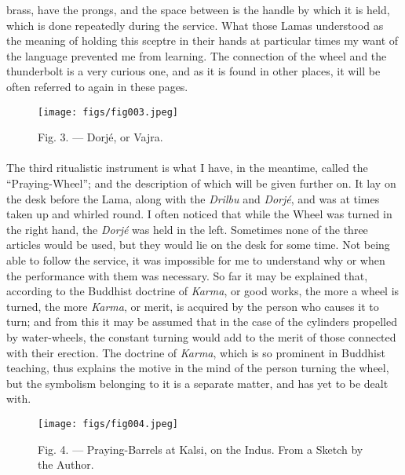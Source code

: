 \documentclass[a4paper, 11pt, oneside, polutonikogreek, english]{article}
\begin{document}
brass, have the prongs, and the space between is the handle by which it is held, which is done repeatedly during the service. What those Lamas understood as the meaning of holding this sceptre in their hands at particular times my want of the language prevented me from learning. The connection of the wheel and the thunderbolt is a very curious one, and as it is found in other places, it will be often referred to again in these pages.

\begin{figure}[H]
\centering
\texttt{[image: figs/fig003.jpeg]}
\caption{Fig. 3. --- Dorjé, or Vajra.}
\end{figure}
\paragraph{}
The third ritualistic instrument is what I have, in the meantime, called the ``Praying-Wheel''; and the description of which will be given further on. It lay on the desk before the Lama, along with the \emph{Drilbu} and \emph{Dorjé}, and was at times taken up and whirled round. I often noticed that while the Wheel was turned in the right hand, the \emph{Dorjé} was held in the left. Sometimes none of the three articles would be used, but they would lie on the desk for some time. Not being able to follow the service, it was impossible for me to understand why or when the performance with them was necessary. So far it may be explained that, according to the Buddhist doctrine of \emph{Karma}, or good works, the more a wheel is turned, the more \emph{Karma}, or merit, is acquired by the person who causes it to turn; and from this it may be assumed that in the case of the cylinders propelled by water-wheels, the constant turning would add to the merit of those connected with their erection. The doctrine of \emph{Karma}, which is so prominent in Buddhist teaching, thus explains the motive in the mind of the person turning the wheel, but the symbolism belonging to it is a separate matter, and has yet to be dealt with.

\begin{figure}[H]
\centering
\texttt{[image: figs/fig004.jpeg]}
\caption{Fig. 4. --- Praying-Barrels at Kalsi, on the Indus. From a Sketch by the Author.}
\end{figure}
\end{document}
